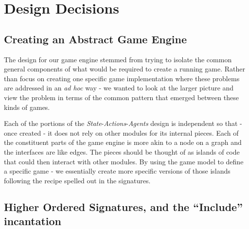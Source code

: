 \documentclass[9pt,letterpaper]{extarticle}
\begin{document}
	\section{Design Decisions}

  \subsection{Creating an Abstract Game Engine}
  The design for our game engine stemmed from trying to isolate the common
  general components of what would be required to create a running game.
  Rather than focus on creating one specific game implementation where these
  problems are addressed in an \textit{ad hoc} way - we wanted to
  look at the larger picture and view the problem in terms of the common pattern
  that emerged between these kinds of games.
  
  Each of the portions of the \textit{State}-\textit{Actions}-\textit{Agents}
  design is independent so that - once created - it does not rely on other
  modules for its internal pieces.
  Each of the constituent parts of the game engine is more akin to a node on a
  graph and the interfaces are like edges.
  The pieces should be thought of as islands of code that could then interact
  with other modules. By using the game model to define a specific game - we
  essentially create more specific versions of those islands following the
  recipe spelled out in the signatures.

  \subsection{Higher Ordered Signatures, and the ``Include'' incantation}
\end{document}
